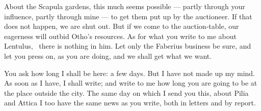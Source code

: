  About the Scapula gardens, this much seems possible --- partly through your influence, partly through mine --- to get them put up by the auctioneer. If that does not happen, we are shut out. But if we come to the auction-table, our eagerness will outbid Otho's resources. As for what you write to me about Lentulus, \dag\ there is nothing in him\dag. Let only the Faberius business be sure, and let you press on, as you are doing, and we shall get what we want.

 You ask how long I shall be here: a few days. But I have not made up my mind. As soon as I have, I shall write; and write to me how long you are going to be at the place outside the city. The same day on which I send you this, about Pilia and Attica I too have the same news as you write, both in letters and by report.
